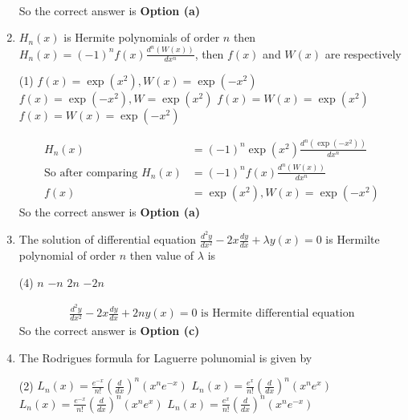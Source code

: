 \begin{enumerate}[label=\color{ocre}\textbf{\arabic*.}]
\begin{answer}
\begin{align*}
	\end{align*}
	So the correct answer is \textbf{Option (a)}
\end{answer}
\item $H_{n}(x)$ is Hermite polynomials of order $n$ then $H_{n}(x)=(-1)^{n} f(x) \frac{d^{n}(W(x))}{d x^{n}}$, then $f(x)$ and $W(x)$ are respectively
 \begin{tasks}(1)
	\task[\textbf{a.}]$f(x)=\exp \left(x^{2}\right), W(x)=\exp \left(-x^{2}\right)$
	\task[\textbf{b.}]$f(x)=\exp \left(-x^{2}\right), W=\exp \left(x^{2}\right)$
	\task[\textbf{c.}] $f(x)=W(x)=\exp \left(x^{2}\right)$
	\task[\textbf{d.}] $f(x)=W(x)=\exp \left(-x^{2}\right)$
\end{tasks}
\begin{answer}
	\begin{align*}
	H_{n}(x)&=(-1)^{n} \exp \left(x^{2}\right) \frac{d^{n}\left(\exp \left(-x^{2}\right)\right)}{d x^{n}}\\
	\text{So after comparing }H_{n}(x)&=(-1)^{n} f(x) \frac{d^{n}(W(x))}{d x^{n}}\\
	f(x)&=\exp \left(x^{2}\right), W(x)=\exp \left(-x^{2}\right)
	\end{align*}
		So the correct answer is \textbf{Option (a)}
\end{answer}
\item The solution of differential equation $\frac{d^{2} y}{d x^{2}}-2 x \frac{d y}{d x}+\lambda y(x)=0$ is Hermilte polynomial of order $n$ then value of $\lambda$ is
 \begin{tasks}(4)
	\task[\textbf{a.}]$n$
	\task[\textbf{b.}] $-n$
	\task[\textbf{c.}]$2 n$
	\task[\textbf{d.}] $-2 n$
\end{tasks}
\begin{answer}
	\begin{align*}
	\frac{d^{2} y}{d x^{2}}-2 x \frac{d y}{d x}+2 n y(x)=0\text{ is Hermite differential equation}
	\end{align*}
		So the correct answer is \textbf{Option (c)}
\end{answer}
\item The Rodrigues formula for Laguerre polunomial is given by
 \begin{tasks}(2)
	\task[\textbf{a.}]$L_n(x)=\frac{e^{-x}}{n !}\left(\frac{d}{d x}\right)^{n}\left(x^{n} e^{-x}\right)$
	\task[\textbf{b.}]$L_{n}(x)=\frac{e^{x}}{n !}\left(\frac{d}{d x}\right)^{n}\left(x^{n} e^{x}\right)$
	\task[\textbf{c.}]$L_n(x)=\frac{e^{-x}}{n !}\left(\frac{d}{d x}\right)^{n}\left(x^{n} e^{x}\right)$
	\task[\textbf{d.}] $L_{n}(x)=\frac{e^{x}}{n !}\left(\frac{d}{d x}\right)^{n}\left(x^{n} e^{-x}\right)$

\end{tasks}
\end{enumerate}

